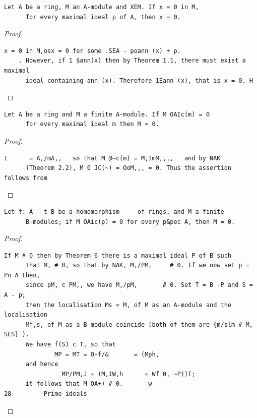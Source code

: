 \begin{theorem}\label{mcrt-auto-theorem-4-6}\uses{}
\begin{verbatim}
Let A be a ring, M an A-module and XEM. If x = 0 in M,
      for every maximal ideal p of A, then x = 0.
\end{verbatim}
\end{theorem}
\begin{proof}
\begin{verbatim}
x = 0 in M,osx = 0 for some .SEA - poann (x) + p.
    . However, if 1 $ann(x) then by Theorem 1.1, there must exist a maximal
      ideal containing ann (x). Therefore 1Eann (x), that is x = 0. H
\end{verbatim}
\end{proof}


\begin{theorem}\label{mcrt-auto-theorem-4-8}\uses{}
\begin{verbatim}
Let A be a ring and M a finite A-module. If M OAIc(m) = 0
      for every maximal ideal m then M = 0.
\end{verbatim}
\end{theorem}
\begin{proof}
\begin{verbatim}
I      = A,/mA,,   so that M @~c(m) = M,ImM,,,,   and by NAK
      (Theorem 2.2), M 0 JC(~) = OoM,,, = 0. Thus the assertion follows from
\end{verbatim}
\end{proof}


\begin{theorem}\label{mcrt-auto-theorem-4-9}\uses{}
\begin{verbatim}
Let f: A --t B be a homomorphism     of rings, and M a finite
      B-modules; if M OAic(p) = 0 for every p&pec A, then M = 0.
\end{verbatim}
\end{theorem}
\begin{proof}
\begin{verbatim}
If M # 0 then by Theorem 6 there is a maximal ideal P of B such
      that M, # 0, so that by NAK, M,/PM,     # 0. If we now set p = Pn A then,
      since pM, c PM,, we have M,/pM,       # 0. Set T = B -P and S = A - p;
      then the localisation Ms = M, of M as an A-module and the localisation
      Mf,s, of M as a B-module coincide (both of them are {m/slm # M, SES} ).
      We have f(S) c T, so that
              MP = MT = O-f/&       = (Mph,
      and hence
                MP/PM,J = (M,IW,h      = Wf 0, ~P))T;
      it follows that M OA+) # 0.       w
28         Prime ideals
\end{verbatim}
\end{proof}


